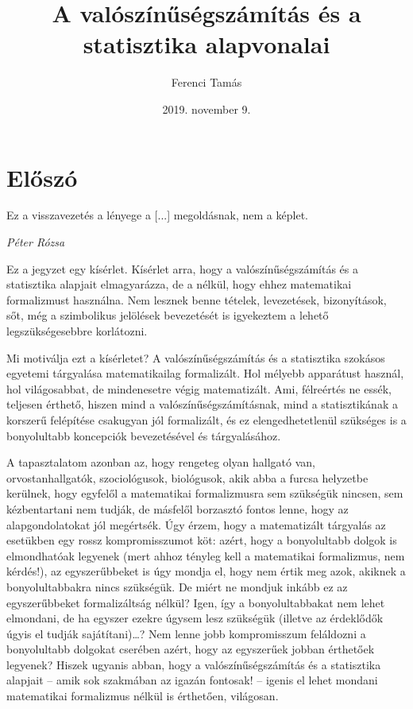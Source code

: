 \documentclass[magyar,]{book}
\title{A valószínűségszámítás és a statisztika alapvonalai}
\author{Ferenci Tamás}
\date{2019. november 9.}
\begin{document}
\maketitle

{
\setcounter{tocdepth}{1}
\tableofcontents
}
\hypertarget{elux151szuxf3}{%
\chapter*{Előszó}\label{elux151szuxf3}}

\epigraph{Ez a visszavezetés a lényege a [...] megoldásnak, nem a képlet.}{\textit{Péter Rózsa}}

Ez a jegyzet egy kísérlet. Kísérlet arra, hogy a valószínűségszámítás és a statisztika alapjait elmagyarázza, de a nélkül, hogy ehhez matematikai formalizmust használna. Nem lesznek benne tételek, levezetések, bizonyítások, sőt, még a szimbolikus jelölések bevezetését is igyekeztem a lehető legszükségesebbre korlátozni.

Mi motiválja ezt a kísérletet? A valószínűségszámítás és a statisztika szokásos egyetemi tárgyalása matematikailag formalizált. Hol mélyebb apparátust használ, hol világosabbat, de mindenesetre végig matematizált. Ami, félreértés ne essék, teljesen érthető, hiszen mind a valószínűségszámításnak, mind a statisztikának a korszerű felépítése csakugyan jól formalizált, és ez elengedhetetlenül szükséges is a bonyolultabb koncepciók bevezetésével és tárgyalásához.

A tapasztalatom azonban az, hogy rengeteg olyan hallgató van, orvostanhallgatók, szociológusok, biológusok, akik abba a furcsa helyzetbe kerülnek, hogy egyfelől a matematikai formalizmusra sem szükségük nincsen, sem kézbentartani nem tudják, de másfelől borzasztó fontos lenne, hogy az alapgondolatokat jól megértsék. Úgy érzem, hogy a matematizált tárgyalás az esetükben egy rossz kompromisszumot köt: azért, hogy a bonyolultabb dolgok is elmondhatóak legyenek (mert ahhoz tényleg kell a matematikai formalizmus, nem kérdés!), az egyszerűbbeket is úgy mondja el, hogy nem értik meg azok, akiknek a bonyolultabbakra nincs szükségük. De miért ne mondjuk inkább ez az egyszerűbbeket formalizáltság nélkül? Igen, így a bonyolultabbakat nem lehet elmondani, de ha egyszer ezekre úgysem lesz szükségük (illetve az érdeklődők úgyis el tudják sajátítani)\ldots? Nem lenne jobb kompromisszum feláldozni a bonyolultabb dolgokat cserében azért, hogy az egyszerűek jobban érthetőek legyenek? Hiszek ugyanis abban, hogy a valószínűségszámítás és a statisztika alapjait -- amik sok szakmában az igazán fontosak! -- igenis el lehet mondani matematikai formalizmus nélkül is érthetően, világosan.
\end{document}
